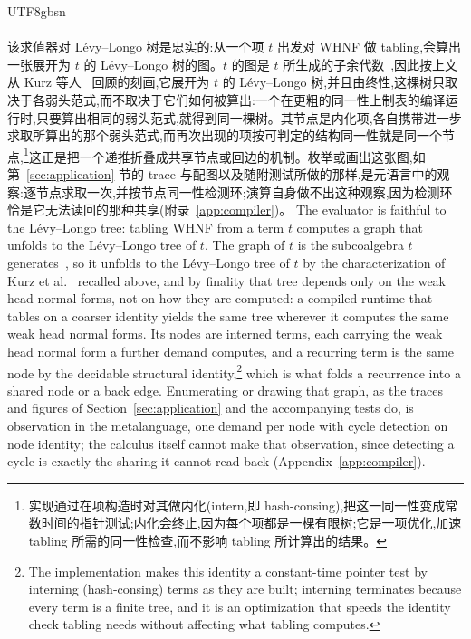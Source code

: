 \begin{CJK*}{UTF8}{gbsn}
  \paragraph{}
  \ifPaperChinese
  该求值器对 Lévy--Longo 树是忠实的:从一个项 $t$ 出发对 \textsf{WHNF} 做 tabling,会算出一张展开为 $t$ 的 Lévy--Longo 树的图。$t$ 的图是 $t$ 所生成的子余代数~\cite{rutten2000-universal-coalgebra, milius2015-finitary-corecursion},因此按上文从 Kurz 等人~\cite{kurz2013-nominal-coalgebraic-data-types} 回顾的刻画,它展开为 $t$ 的 Lévy--Longo 树,并且由终性,这棵树只取决于各弱头范式,而不取决于它们如何被算出:一个在更粗的同一性上制表的编译运行时,只要算出相同的弱头范式,就得到同一棵树。其节点是内化项,各自携带进一步求取所算出的那个弱头范式,而再次出现的项按可判定的结构同一性就是同一个节点,\footnote{实现通过在项构造时对其做内化(intern,即 hash-consing),把这一同一性变成常数时间的指针测试;内化会终止,因为每个项都是一棵有限树;它是一项优化,加速 tabling 所需的同一性检查,而不影响 tabling 所计算出的结果。}这正是把一个递推折叠成共享节点或回边的机制。枚举或画出这张图,如第~\ref{sec:application} 节的 trace 与配图以及随附测试所做的那样,是元语言中的观察:逐节点求取一次,并按节点同一性检测环;演算自身做不出这种观察,因为检测环恰是它无法读回的那种共享(附录~\ref{app:compiler})。
  \else
  The evaluator is faithful to the L\'evy--Longo tree: tabling \textsf{WHNF} from a term $t$ computes a graph that unfolds to the L\'evy--Longo tree of $t$. The graph of $t$ is the subcoalgebra $t$ generates~\cite{rutten2000-universal-coalgebra, milius2015-finitary-corecursion}, so it unfolds to the L\'evy--Longo tree of $t$ by the characterization of Kurz et al.~\cite{kurz2013-nominal-coalgebraic-data-types} recalled above, and by finality that tree depends only on the weak head normal forms, not on how they are computed: a compiled runtime that tables on a coarser identity yields the same tree wherever it computes the same weak head normal forms. Its nodes are interned terms, each carrying the weak head normal form a further demand computes, and a recurring term is the same node by the decidable structural identity,\footnote{The implementation makes this identity a constant-time pointer test by interning (hash-consing) terms as they are built; interning terminates because every term is a finite tree, and it is an optimization that speeds the identity check tabling needs without affecting what tabling computes.} which is what folds a recurrence into a shared node or a back edge. Enumerating or drawing that graph, as the traces and figures of Section~\ref{sec:application} and the accompanying tests do, is observation in the metalanguage, one demand per node with cycle detection on node identity; the calculus itself cannot make that observation, since detecting a cycle is exactly the sharing it cannot read back (Appendix~\ref{app:compiler}).
  \fi



\end{CJK*}
